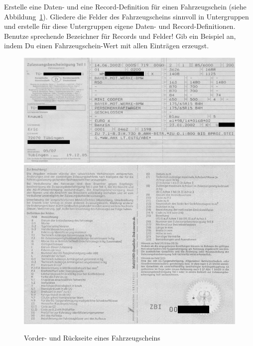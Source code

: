 \begin{aufgabe}

  Erstelle eine Daten- und eine Record-Definition für einen
    Fahrzeugschein (siehe Abbildung~\ref{fig:fahrzeugschein}).  Gliedere die Felder des
    Fahrzeugscheins sinnvoll in Untergruppen und erstelle für diese
    Untergruppen eigene Daten- und Record-Definitionen.  Benutze
    sprechende Bezeichner für Records und Felder!  Gib ein
    Beispiel an, indem Du einen Fahrzeugschein-Wert mit allen Einträgen
    erzeugst.
    
    
    \begin{figure}[tb]
      \includegraphics[width=\linewidth]{zusammengesetzte-daten/kfzschein-front}\\
      \medskip
      \includegraphics[width=\linewidth]{zusammengesetzte-daten/kfzschein-back}
      \caption{Vorder- und Rückseite eines Fahrzeugscheins}
      \label{fig:fahrzeugschein}
    \end{figure}
\end{aufgabe}

